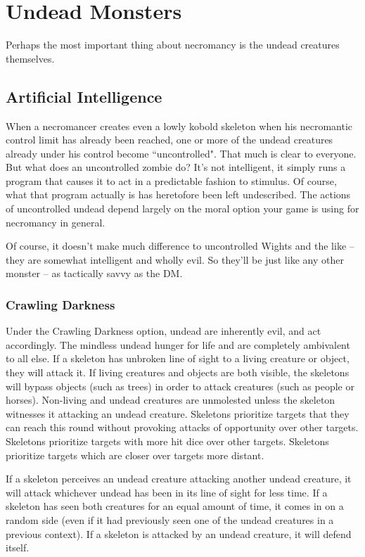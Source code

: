 \section{Undead Monsters}

Perhaps the most important thing about necromancy is the undead creatures themselves.

\subsection{Artificial Intelligence}

When a necromancer creates even a lowly kobold skeleton when his necromantic control limit has already been reached, one or more of the undead creatures already under his control become ``uncontrolled". That much is clear to everyone. But what does an uncontrolled zombie do? It's not intelligent, it simply runs a program that causes it to act in a predictable fashion to stimulus. Of course, what that program actually is has heretofore been left undescribed. The actions of uncontrolled undead depend largely on the moral option your game is using for necromancy in general.

Of course, it doesn't make much difference to uncontrolled Wights and the like -- they are somewhat intelligent and wholly evil. So they'll be just like any other monster -- as tactically savvy as the DM.

\subsubsection{Crawling Darkness}

Under the Crawling Darkness option, undead are inherently evil, and act accordingly. The mindless undead hunger for life and are completely ambivalent to all else. If a skeleton has unbroken line of sight to a living creature or object, they will attack it. If living creatures and objects are both visible, the skeletons will bypass objects (such as trees) in order to attack creatures (such as people or horses). Non-living and undead creatures are unmolested unless the skeleton witnesses it attacking an undead creature. Skeletons prioritize targets that they can reach this round without provoking attacks of opportunity over other targets. Skeletons prioritize targets with more hit dice over other targets. Skeletons prioritize targets which are closer over targets more distant.

If a skeleton perceives an undead creature attacking another undead creature, it will attack whichever undead has been in its line of sight for less time. If a skeleton has seen both creatures for an equal amount of time, it comes in on a random side (even if it had previously seen one of the undead creatures in a previous context). If a skeleton is attacked by an undead creature, it will defend itself.

